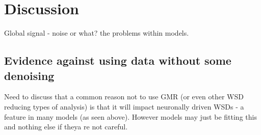 \documentclass[oneside]{zHenriquesLab-StyleBioRxiv}
\begin{document}


























\section*{Discussion}
Global signal - noise or what? the problems within models. 

\subsection*{Evidence against using data without some denoising} 
Need to discuss that a common reason not to use GMR (or even other WSD reducing types of analysis) is that it will impact neuronally driven WSDs - a feature in many models (as seen above). However models may just be fitting this and nothing else if theya re not careful. 
\end{document}

